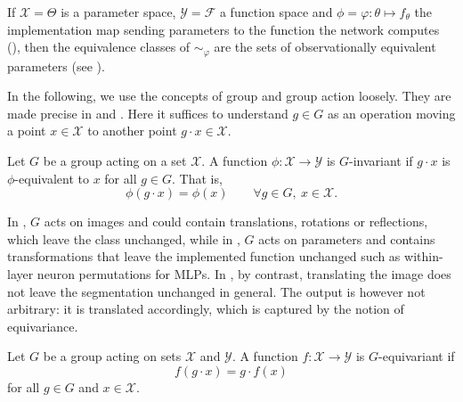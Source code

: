 \documentclass[mathematics,review,submit,moreauthors]{Definitions/mdpi}
\begin{document}
\begin{Example}\label{ex:equivalence_observational}
    If $\mathcal{X}=\Theta$ is a parameter space, $\mathcal{Y}=\mathcal{F}$ a function space and $\phi=\varphi:\theta\mapsto f_\theta$ the implementation map sending parameters to the function the network computes (), then the equivalence classes of $\sim_\varphi$ are the sets of observationally equivalent parameters (see ).
\end{Example}

In the following, we use the concepts of group and group action loosely.
They are made precise in  and .
Here it suffices to understand $g\in G$ as an operation moving a point $x\in\mathcal{X}$ to another point $g\cdot x\in\mathcal{X}$.

\begin{Definition}[Invariance]\label{def:invariance}
    Let $G$ be a group acting on a set $\mathcal{X}$.
    A function $\phi : \mathcal{X} \to \mathcal{Y}$ is $G$-invariant if $g\cdot x$ is $\phi$-equivalent to $x$ for all $g\in G$.
    That is, 
    \[
        \phi(g\cdot x)=\phi(x)\qquad\forall g\in G,\ x\in\mathcal{X}.
    \]
\end{Definition}

In , $G$ acts on images and could contain translations, rotations or reflections, which leave the class unchanged, while in , $G$ acts on parameters and contains transformations that leave the implemented function unchanged such as within-layer neuron permutations for MLPs.
In , by contrast, translating the image does not leave the segmentation unchanged in general.
The output is however not arbitrary: it is translated accordingly, which is captured by the notion of equivariance.

\begin{Definition}[Equivariance]\label{def:equivariance}
    Let $G$ be a group acting on sets $\mathcal{X}$ and $\mathcal{Y}$. 
    A function $f : \mathcal{X} \to \mathcal{Y}$ is $G$-equivariant if
    \[
        f(g \cdot x) = g \cdot f(x)
    \]
    for all $g \in G$ and $x \in \mathcal{X}$.
\end{Definition}
\end{document}
